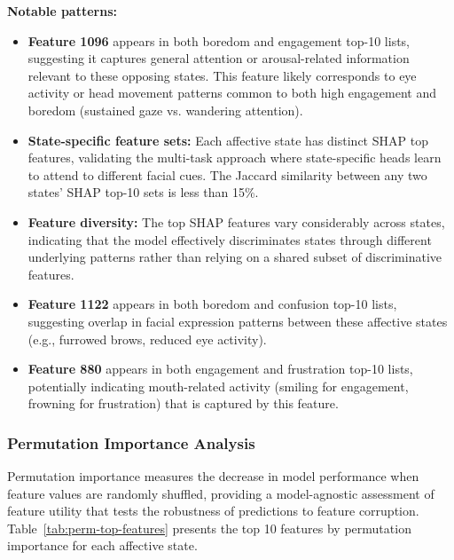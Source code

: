 \textbf{Notable patterns:}
\begin{itemize}
    \item \textbf{Feature 1096} appears in both boredom and engagement top-10 lists, suggesting it captures general attention or arousal-related information relevant to these opposing states. This feature likely corresponds to eye activity or head movement patterns common to both high engagement and boredom (sustained gaze vs. wandering attention).

    \item \textbf{State-specific feature sets:} Each affective state has distinct SHAP top features, validating the multi-task approach where state-specific heads learn to attend to different facial cues. The Jaccard similarity between any two states' SHAP top-10 sets is less than 15\%.

    \item \textbf{Feature diversity:} The top SHAP features vary considerably across states, indicating that the model effectively discriminates states through different underlying patterns rather than relying on a shared subset of discriminative features.
    
    \item \textbf{Feature 1122} appears in both boredom and confusion top-10 lists, suggesting overlap in facial expression patterns between these affective states (e.g., furrowed brows, reduced eye activity).
    
    \item \textbf{Feature 880} appears in both engagement and frustration top-10 lists, potentially indicating mouth-related activity (smiling for engagement, frowning for frustration) that is captured by this feature.
\end{itemize}

\subsubsection{Permutation Importance Analysis}
\label{sec:permutation-importance}

Permutation importance measures the decrease in model performance when feature values are randomly shuffled, providing a model-agnostic assessment of feature utility that tests the robustness of predictions to feature corruption. Table~\ref{tab:perm-top-features} presents the top 10 features by permutation importance for each affective state.

